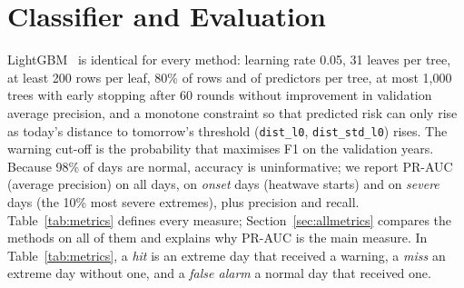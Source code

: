 \documentclass[12pt,a4paper]{report}
\begin{document}
\section{Classifier and Evaluation}
\label{sec:metricsdef}
LightGBM~\cite{ke2017lightgbm} is identical for every method: learning rate 0.05, 31 leaves per tree, at least 200
rows per leaf, 80\% of rows and of predictors per tree, at most 1{,}000 trees with early stopping after 60 rounds
without improvement in validation average precision, and a monotone constraint so that predicted risk can only rise as
today's distance to tomorrow's threshold (\texttt{dist\_l0}, \texttt{dist\_std\_l0}) rises. The warning cut-off is the
probability that maximises F1 on the validation years. Because 98\% of days are normal, accuracy is
uninformative; we report PR-AUC (average precision) on all days, on \emph{onset} days (heatwave starts) and on
\emph{severe} days (the 10\% most severe extremes), plus precision and recall. Table~\ref{tab:metrics} defines every
measure; Section~\ref{sec:allmetrics} compares the methods on all of them and explains why PR-AUC is the main
measure. In Table~\ref{tab:metrics}, a \emph{hit} is an extreme day that received a warning, a \emph{miss} an extreme day without one, and a
\emph{false alarm} a normal day that received one.
\end{document}
